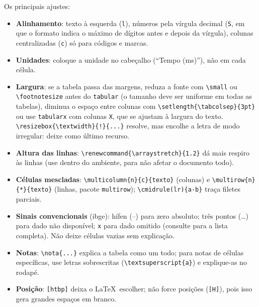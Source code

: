 Os principais ajustes:
\begin{itemize}
  \item \textbf{Alinhamento}: \sloppy texto à esquerda (\texttt{l}), números pela vírgula decimal
        (\texttt{S\allowbreak[table-format=3.1]}, em que o formato indica o máximo de dígitos antes e
        depois da vírgula), colunas centralizadas (\texttt{c}) só para códigos e marcas.
  \item \textbf{Unidades}: coloque a unidade no cabeçalho (``Tempo (ms)''), não em cada célula.
  \item \textbf{Largura}: se a tabela passa das margens, reduza a fonte com
        \texttt{\textbackslash small} ou \texttt{\textbackslash footnotesize} antes do
        \texttt{tabular} (o tamanho deve ser uniforme em todas as tabelas),
        diminua o espaço entre colunas com \texttt{\textbackslash setlength\{\textbackslash tabcolsep\}\{3pt\}}
        ou use \texttt{tabularx} com colunas \texttt{X}, que se ajustam à largura do texto.
        \texttt{\textbackslash resizebox\{\textbackslash textwidth\}\{!\}\{...\}} resolve, mas
        encolhe a letra de modo irregular: deixe como último recurso.
  \item \textbf{Altura das linhas}: \texttt{\textbackslash renewcommand\{\textbackslash arraystretch\}\{1.2\}}
        dá mais respiro às linhas (use dentro do ambiente, para não afetar o documento todo).
  \item \textbf{Células mescladas}: \texttt{\textbackslash multicolumn\allowbreak\{n\}\allowbreak\{c\}\allowbreak\{texto\}}
        (colunas) e \texttt{\textbackslash multirow\allowbreak\{n\}\allowbreak\{*\}\allowbreak\{texto\}} (linhas, pacote
        \texttt{multirow}); \texttt{\textbackslash cmidrule(lr)\{a-b\}} traça filetes parciais.
  \item \textbf{Sinais convencionais} (\ac{ibge}): hífen (--) para zero absoluto; três pontos
        (\ldots) para dado não disponível; \texttt{x} para dado omitido (consulte
        \cite{ibge1993} para a lista completa). Não deixe células vazias sem explicação.
  \item \textbf{Notas}: \texttt{\textbackslash nota\{...\}} explica a tabela como um todo;
        para notas de células específicas, use letras sobrescritas
        (\texttt{\textbackslash textsuperscript\{a\}}) e explique-as no rodapé.
  \item \textbf{Posição}: \texttt{[htbp]} deixa o \LaTeX\ escolher; não force posições
        (\texttt{[H]}), pois isso gera grandes espaços em branco.
\end{itemize}

